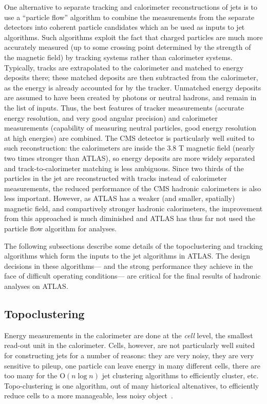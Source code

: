 One alternative to separate tracking and calorimeter reconstructions of jets is to use a ``particle flow'' algorithm to combine the measurements from the separate detectors into coherent particle candidates which an be used as inputs to jet algorithms. Such algorithms exploit the fact that charged particles are much more accurately measured (up to some crossing point determined by the strength of the magnetic field) by tracking systems rather than calorimeter systems. Typically, tracks are extrapolated to the calorimeter and matched to energy deposits there; these matched deposits are then subtracted from the calorimeter, as the energy is already accounted for by the tracker. Unmatched energy deposits are assumed to have been created by photons or neutral hadrons, and remain in the list of inputs. Thus, the best features of tracker measurements (accurate energy resolution, and very good angular precision) and calorimeter measurements (capability of measuring neutral particles, good energy resolution at high energies) are combined. The CMS detector is particularly well suited to such reconstruction: the calorimeters are inside the 3.8 T magnetic field (nearly two times stronger than ATLAS), so energy deposits are more widely separated and track-to-calorimeter matching is less ambiguous. Since two thirds of the particles in the jet are reconstructed with tracks instead of calorimeter measurements, the reduced performance of the CMS hadronic calorimeters is also less important. However, as ATLAS has a weaker (and smaller, spatially) magnetic field, and compartively stronger hadronic calorimeters, the improvement from this approached is much diminished and ATLAS has thus far not used the particle flow algorithm for analyses. 

The following subsections describe some details of the topoclustering and tracking algorithms which form the inputs to the jet algorithms in ATLAS. The design decisions in these algorithms--- and the strong performance they achieve in the face of difficult operating conditions--- are critical for the final results of hadronic analyses on ATLAS.

\subsection{Topoclustering}
\label{jet-reconstruction:jet-inputs:topoclustering}

Energy measurements in the calorimeter are done at the \textit{cell} level, the smallest read-out unit in the calorimeter. Cells, however, are not particularly well suited for constructing jets for a number of reasons: they are very noisy, they are very sensitive to pileup, one particle can leave energy in many different cells,  there are too many for the $\mathrm{O}( n \log n)$ jet clustering algorithms to efficiently cluster, etc. Topo-clustering is one algorithm, out of many historical altenatives, to efficiently reduce cells to a more manageable, less noisy object~\cite{JES2010,JES2011}.

